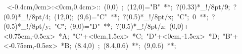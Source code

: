 \hbox{
\xy    <-0.4cm,0cm>:<0cm,0.4cm>::
       (0,0) ; (12,0)="B" **\dir{-}; ?(0.33)*_!/8pt/{9};
       ?(0.9)*_!/8pt/{4}; (12,0); (9,6)="C" **\dir{-};
       ?(0.5)*_!/8pt/{x};
       "C"; 0 **\dir{-}; ?(0.5)*_!/8pt/{y}; 
       "C"; (9,0)="D" **\dir{-}; ?(0.5)*_!/8pt/{z}; 
       (0,0)+<0.75em,-0.5ex> *{A};
       "C"+<0em,1.5ex> *{C};
       "D"+<0em,-1.5ex> *{D};
       "B"+<-0.75em,-0.5ex> *{B};
	(8.4,0) ; (8.4,0.6) **\dir{-}; (9,0.6) **\dir{-};
       \endxy}
	   
